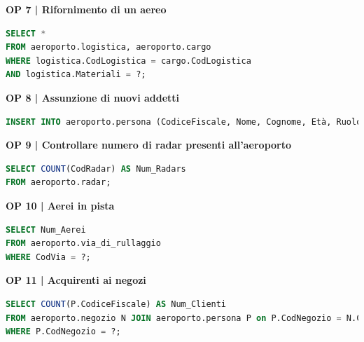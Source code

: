 \newpage %

\textbf{\small OP 7 | Rifornimento di un aereo}\\

\begin{lstlisting}[language=SQL]
SELECT *
FROM aeroporto.logistica, aeroporto.cargo
WHERE logistica.CodLogistica = cargo.CodLogistica
AND logistica.Materiali = ?;	
\end{lstlisting}


\textbf{\small OP 8 | Assunzione di nuovi addetti}\\

\begin{lstlisting}[language=SQL]
INSERT INTO aeroporto.persona (CodiceFiscale, Nome, Cognome, Età, Ruolo, Ora_inizio, Ora_fine) VALUES (?, ?, ?, ?, ?, ?, ?);
\end{lstlisting}


\textbf{\small OP 9 | Controllare numero di radar presenti all'aeroporto}\\ %

\begin{lstlisting}[language=SQL]
SELECT COUNT(CodRadar) AS Num_Radars
FROM aeroporto.radar;
\end{lstlisting}


\textbf{\small OP 10 | Aerei in pista}\\ %

\begin{lstlisting}[language=SQL]
SELECT Num_Aerei
FROM aeroporto.via_di_rullaggio
WHERE CodVia = ?;	
\end{lstlisting}


\textbf{\small OP 11 | Acquirenti ai negozi}\\ %

\begin{lstlisting}[language=SQL]
SELECT COUNT(P.CodiceFiscale) AS Num_Clienti
FROM aeroporto.negozio N JOIN aeroporto.persona P on P.CodNegozio = N.CodNegozio
WHERE P.CodNegozio = ?;
\end{lstlisting}


